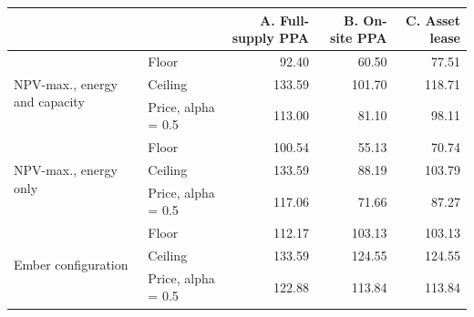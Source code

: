 \begin{tabular}{llrrr}
\toprule
 &  & A. Full-supply PPA & B. On-site PPA & C. Asset lease \\
\midrule
\multirow[t]{3}{*}{NPV-max., energy and capacity} & Floor & 92.40 & 60.50 & 77.51 \\
 & Ceiling & 133.59 & 101.70 & 118.71 \\
 & Price, alpha = 0.5 & 113.00 & 81.10 & 98.11 \\
\cline{1-5}
\multirow[t]{3}{*}{NPV-max., energy only} & Floor & 100.54 & 55.13 & 70.74 \\
 & Ceiling & 133.59 & 88.19 & 103.79 \\
 & Price, alpha = 0.5 & 117.06 & 71.66 & 87.27 \\
\cline{1-5}
\multirow[t]{3}{*}{Ember configuration} & Floor & 112.17 & 103.13 & 103.13 \\
 & Ceiling & 133.59 & 124.55 & 124.55 \\
 & Price, alpha = 0.5 & 122.88 & 113.84 & 113.84 \\
\cline{1-5}
\bottomrule
\end{tabular}

